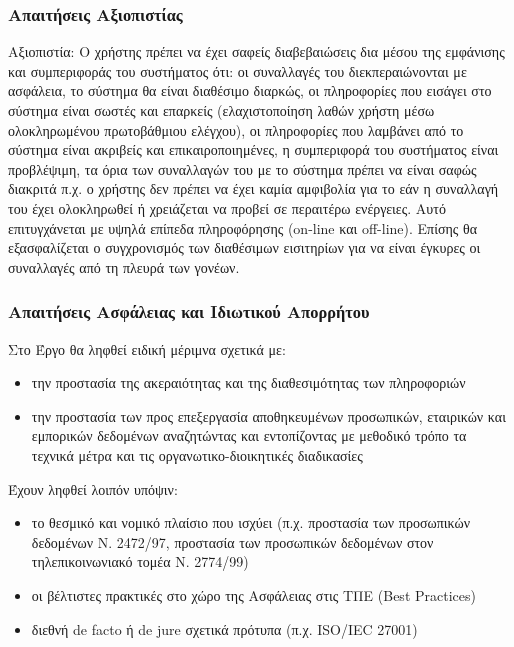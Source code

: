\documentclass[letterpaper,6pt]{article}
\begin{document}
\subsubsection{Απαιτήσεις Αξιοπιστίας}
	Αξιοπιστία: Ο χρήστης πρέπει να έχει σαφείς διαβεβαιώσεις δια μέσου της εμφάνισης και συμπεριφοράς του συστήματος ότι: οι συναλλαγές του διεκπεραιώνονται με ασφάλεια, το σύστημα θα είναι διαθέσιμο διαρκώς, οι πληροφορίες που εισάγει στο σύστημα είναι σωστές και επαρκείς (ελαχιστοποίηση λαθών χρήστη μέσω ολοκληρωμένου πρωτοβάθμιου ελέγχου), οι πληροφορίες που λαμβάνει από το σύστημα είναι ακριβείς και επικαιροποιημένες, η συμπεριφορά του συστήματος είναι προβλέψιμη, τα όρια των συναλλαγών του με το σύστημα πρέπει να είναι σαφώς διακριτά π.χ. ο χρήστης δεν πρέπει να έχει καμία αμφιβολία για το εάν η συναλλαγή του έχει ολοκληρωθεί ή χρειάζεται να προβεί σε περαιτέρω ενέργειες. Αυτό επιτυγχάνεται με υψηλά επίπεδα πληροφόρησης (on-line και off-line). Επίσης θα εξασφαλίζεται ο συγχρονισμός των διαθέσιμων εισιτηρίων για να είναι έγκυρες οι συναλλαγές από τη πλευρά των γονέων.
	
\subsubsection{Απαιτήσεις Ασφάλειας και Ιδιωτικού Απορρήτου}

Στο Έργο θα ληφθεί ειδική μέριμνα σχετικά με: 
\begin{itemize}
  \item την προστασία της ακεραιότητας και της διαθεσιμότητας των πληροφοριών
  \item την προστασία των προς επεξεργασία αποθηκευμένων προσωπικών, εταιρικών και εμπορικών δεδομένων αναζητώντας και εντοπίζοντας με μεθοδικό τρόπο τα τεχνικά μέτρα και τις οργανωτικο-διοικητικές διαδικασίες
\end{itemize}
Έχουν ληφθεί λοιπόν υπόψιν:
\begin{itemize}
  \item το θεσμικό και νομικό πλαίσιο που ισχύει (π.χ. προστασία των προσωπικών δεδομένων Ν. 2472/97, προστασία των προσωπικών δεδομένων στον τηλεπικοινωνιακό τομέα Ν. 2774/99)
  \item οι βέλτιστες πρακτικές στο χώρο της Ασφάλειας στις ΤΠΕ (Best Practices)
  \item διεθνή de facto ή de jure σχετικά πρότυπα (π.χ. ISO/IEC 27001)
\end{itemize}
	
\end{document}
